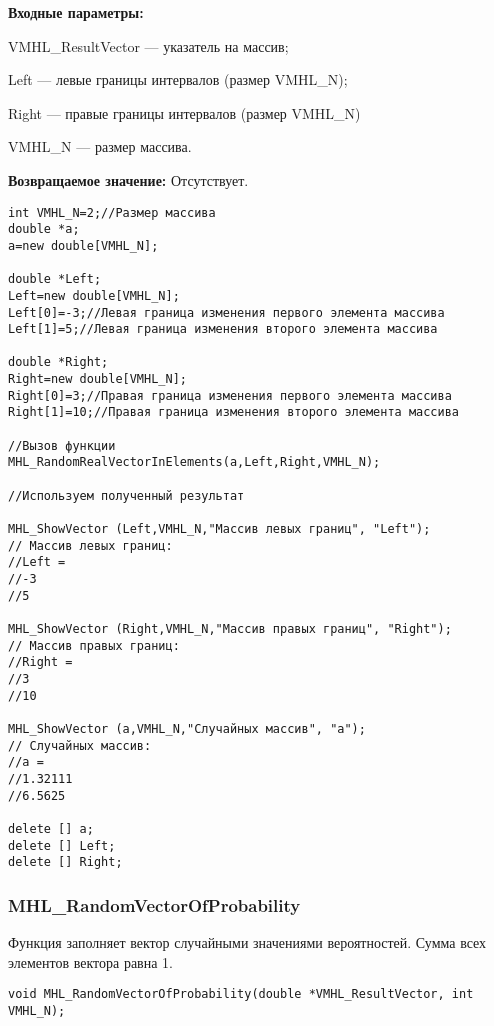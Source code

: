 \documentclass[a4paper,12pt]{article}
\begin{document}
\textbf{Входные параметры:}

 VMHL\_ResultVector --- указатель на массив;
 
 Left --- левые границы интервалов (размер VMHL\_N);
 
 Right --- правые границы интервалов (размер VMHL\_N)
 
 VMHL\_N --- размер массива.

\textbf{Возвращаемое значение:}
Отсутствует.


\begin{lstlisting}[label=code_use_MHL_RandomRealVectorInElements,caption=Пример использования]
int VMHL_N=2;//Размер массива
double *a;
a=new double[VMHL_N];

double *Left;
Left=new double[VMHL_N];
Left[0]=-3;//Левая граница изменения первого элемента массива
Left[1]=5;//Левая граница изменения второго элемента массива

double *Right;
Right=new double[VMHL_N];
Right[0]=3;//Правая граница изменения первого элемента массива
Right[1]=10;//Правая граница изменения второго элемента массива

//Вызов функции
MHL_RandomRealVectorInElements(a,Left,Right,VMHL_N);

//Используем полученный результат

MHL_ShowVector (Left,VMHL_N,"Массив левых границ", "Left");
// Массив левых границ:
//Left =
//-3
//5

MHL_ShowVector (Right,VMHL_N,"Массив правых границ", "Right");
// Массив правых границ:
//Right =
//3
//10

MHL_ShowVector (a,VMHL_N,"Случайных массив", "a");
// Случайных массив:
//a =
//1.32111
//6.5625

delete [] a;
delete [] Left;
delete [] Right;
\end{lstlisting}

\subsubsection{MHL\_RandomVectorOfProbability}\label{MHL_RandomVectorOfProbability}

Функция заполняет вектор случайными значениями вероятностей. Сумма всех элементов вектора равна 1.


\begin{lstlisting}[label=code_syntax_MHL_RandomVectorOfProbability,caption=Синтаксис]
void MHL_RandomVectorOfProbability(double *VMHL_ResultVector, int VMHL_N);
\end{lstlisting}
\end{document}
